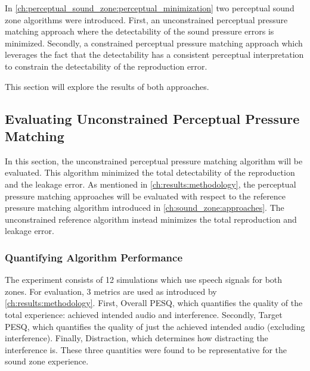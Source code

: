 In \autoref{ch:perceptual_sound_zone:perceptual_minimization} two perceptual sound zone algorithms were introduced. 
First, an unconstrained perceptual pressure matching approach where the detectability of the sound pressure errors is minimized.
Secondly, a constrained perceptual pressure matching approach which leverages the fact that the detectability has a consistent 
perceptual interpretation to constrain the detectability of the reproduction error.

This section will explore the results of both approaches.

\subsection{Evaluating Unconstrained Perceptual Pressure Matching}
In this section, the unconstrained perceptual pressure matching algorithm will be evaluated.
This algorithm minimized the total detectability of the reproduction and the leakage error.
As mentioned in \autoref{ch:results:methodology}, the perceptual pressure matching approaches will be evaluated with respect to the 
reference pressure matching algorithm introduced in \autoref{ch:sound_zone:approaches}.
The unconstrained reference algorithm instead minimizes the total reproduction and leakage error.

\subsubsection*{Quantifying Algorithm Performance}
The experiment consists of 12 simulations which use speech signals for both zones.
For evaluation, 3 metrics are used as introduced by \autoref{ch:results:methodology}.
First, Overall PESQ, which quantifies the quality of the total experience: achieved intended audio and interference.
Secondly, Target PESQ, which quantifies the quality of just the achieved intended audio (excluding interference).
Finally, Distraction, which determines how distracting the interference is.
These three quantities were found to be representative for the sound zone experience.

